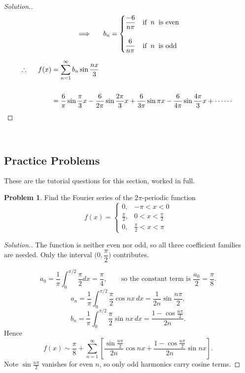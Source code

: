 \documentclass[11pt,a4paper]{article}
\theoremstyle{definition}
\newtheorem{problemx}{Problem}[subsection]
\newenvironment{problem}{\begin{problemx}}{\end{problemx}}
\newenvironment{solution}
  {\renewcommand{\qedsymbol}{}\begin{proof}[\textit{Solution}.]}
  {\end{proof}}
\begin{document}
\begin{solution}
\[\implies \hspace{0.5cm}  b_n = 
\begin{cases}
\dfrac{-6}{n\pi} & \text{if}\hspace{0.2cm} n \hspace{0.2cm} \text{is even}\\\\
\dfrac{6}{n\pi} & \text{if}\hspace{0.2cm} n \hspace{0.2cm} \text{is odd}\\
\end{cases}
\]

\begin{align*}
\therefore \hspace{0.5cm} f(x) & = \sum^{\infty}_{n=1}b_n \sin\frac{nx}{3}\\\\ 
& = \frac{6}{\pi}\sin\frac{\pi}{3} x - \frac{6}{2\pi}\sin\frac{2\pi}{3}  x + \frac{6}{3\pi}\sin\pi x - \frac{6}{4\pi}\sin\frac{4\pi}{3} x + \cdots\cdots\
\end{align*}
\end{solution}

\pagebreak

\

\subsection{Practice Problems}

These are the tutorial questions for this section, worked in full.

\begin{problem}
Find the Fourier series of the $2\pi$-periodic function
$$f(x) = \begin{cases}
0, & -\pi<x<0\\
\frac{\pi}{2}, & 0<x<\frac{\pi}{2}\\
0, & \frac{\pi}{2}<x<\pi
\end{cases}$$
\end{problem}
\begin{solution}
The function is neither even nor odd, so all three coefficient families are
needed. Only the interval $\Big(0,\dfrac{\pi}{2}\Big)$ contributes.

$$a_0 = \frac1\pi\int_0^{\pi/2}\frac{\pi}{2}dx = \frac{\pi}{4},
\qquad\text{so the constant term is } \frac{a_0}{2} = \frac{\pi}{8}.$$
$$a_n = \frac1\pi\int_0^{\pi/2}\frac{\pi}{2}\cos nx\,dx
= \frac{1}{2n}\sin\frac{n\pi}{2},$$
$$b_n = \frac1\pi\int_0^{\pi/2}\frac{\pi}{2}\sin nx\,dx
= \frac{1-\cos\frac{n\pi}{2}}{2n}.$$
Hence
$$f(x) \sim \frac{\pi}{8}
+ \sum_{n=1}^{\infty}\left[\frac{\sin\frac{n\pi}{2}}{2n}\cos nx
+ \frac{1-\cos\frac{n\pi}{2}}{2n}\sin nx\right].$$
Note $\sin\frac{n\pi}{2}$ vanishes for even $n$, so only odd harmonics carry
cosine terms.
\end{solution}
\end{document}
